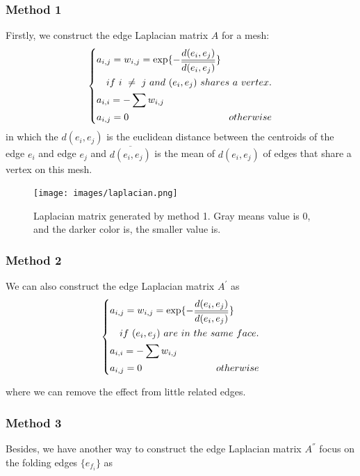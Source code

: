 \subsubsection{Method 1}
Firstly, we construct the edge Laplacian matrix $A$ for a mesh:
\begin{equation}
\left\{
\begin{gathered}
a_{i,j} = w_{i,j} = \exp\{-\frac{d(e_i,e_j)}{\overline{d(e_i,e_j)}}\} \quad \hfill\\  \quad \hfill if~i~\neq~j~and~(e_i,e_j)~shares~a~vertex. \\
a_{i,i} = -\sum w_{i,j} \quad \hfill \\
a_{i,j} = 0 \quad \hfill otherwise \\
\end{gathered}
\right.
\end{equation}
in which the $d(e_i,e_j)$ is the euclidean distance between the centroids of the edge $e_i$ and edge $e_j$ and $\overline{d(e_i,e_j)}$ is the mean of $d(e_i,e_j)$ of edges that share a vertex on this mesh.\\

\begin{figure}[ht]
	\centering
	\texttt{[image: images/laplacian.png]}
	\caption{Laplacian matrix generated by method 1. Gray means value is 0, and the darker color is, the smaller value is.}
	\label{fig:lap}
\end{figure}

\subsubsection{Method 2}
We can also construct the edge Laplacian matrix $A^{'}$ as 
\begin{equation}
\left\{
\begin{gathered}
a_{i,j} = w_{i,j} = \exp\{-\frac{d(e_i,e_j)}{\overline{d(e_i,e_j)}}\} \quad \hfill \\ \quad  \hfill if~(e_i,e_j)~are~in~the~same~face. \\
a_{i,i} = -\sum w_{i,j} \quad \hfill \\
a_{i,j} = 0 \quad \hfill otherwise \\
\end{gathered}
\right.
\end{equation}

where we can remove the effect from little related edges.

\subsubsection{Method 3}
Besides, we have another way to construct the edge Laplacian matrix $A^{''}$ focus on the folding edges $\{e_{f_i}\}$ as

